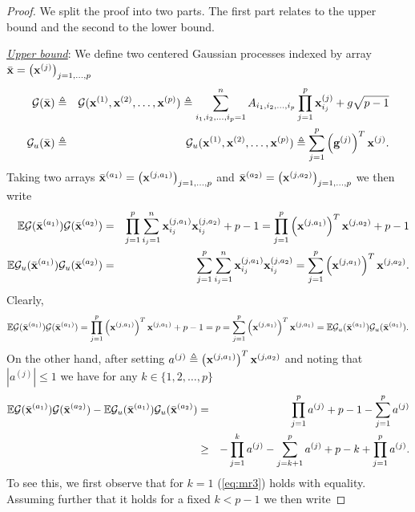 \documentclass[10pt]{article}
\def\x{{\bf x}}
\def\x{{\mathbf x}}
\def\x{{\bf x}}
\def\x{{\bf x}}
\def\g{{\bf g}}
\def\mE{{\mathbb E}}
\def\lp{\left (}
\def\rp{\right )}
\def\x{{\bf x}}
\def\x{{\mathbf x}}
\def\x{{\bf x}}
\def\x{{\bf x}}
\def\g{{\bf g}}
\def\cG{{\mathcal G}}
\begin{document}
\begin{proof}
  We split the proof into two parts. The first part relates to the upper bound and the second to the lower bound.

\noindent  \underline{\emph{Upper bound}}: We define two centered Gaussian processes indexed by array $\bar{\x}=\lp \x^{(j)}\rp_{j=1,\dots,p}$
  \begin{eqnarray}
\label{eq:mr1}
\cG (\bar{\x}) & \triangleq & \cG (\x^{(1)},\x^{(2)},\dots,\x^{(p)})  \triangleq \sum_{i_1,i_2,\dots,i_p=1}^n A_{i_1,i_2,\dots,i_p}\prod_{j=1}^{p}\x_{i_j}^{(j)}   + g\sqrt{p-1}  \nonumber   \\
\cG_u (\bar{\x}) & \triangleq & \cG_u (\x^{(1)},\x^{(2)},\dots,\x^{(p)})  \triangleq \sum_{j=1}^p \lp\g^{(j)}\rp^T\x^{(j)} .
  \end{eqnarray}
Taking two arrays $\bar{\x}^{(a_1)}=\lp \x^{(j,a_1)}\rp_{j=1,\dots,p}$ and $\bar{\x}^{(a_2)}=\lp \x^{(j,a_2)}\rp_{j=1,\dots,p}$ we then write
  \begin{eqnarray}
\label{eq:mr2}
\mE \cG (\bar{\x}^{(a_1)})\cG (\bar{\x}^{(a_2)} )   & =  & \prod_{j=1}^{p}  \sum_{i_j=1}^n   \x_{i_j}^{(j,a_1)}  \x_{i_j}^{(j,a_2)}  + p-1
=  \prod_{j=1}^{p}  \lp \x^{(j,a_1)} \rp^T\x^{(j,a_2)}  + p-1 \nonumber   \\
\mE \cG_u (\bar{\x}^{(a_1)})\cG_u (\bar{\x}^{(a_2)} )   & =  & \sum_{j=1}^p \sum_{i_j=1}^n \x_{i_j}^{(j,a_1)}\x_{i_j}^{(j,a_2)}
=
\sum_{j=1}^p
 \lp \x^{(j,a_1)} \rp^T\x^{(j,a_2)}.
  \end{eqnarray}
  Clearly,
 \begin{eqnarray}
\label{eq:mr2a}
\mE \cG (\bar{\x}^{(a_1)})\cG (\bar{\x}^{(a_1)} )
=  \prod_{j=1}^{p}  \lp \x^{(j,a_1)} \rp^T\x^{(j,a_1)}  + p-1
= p =\sum_{j=1}^p
 \lp \x^{(j,a_1)} \rp^T\x^{(j,a_1)} =
\mE \cG_u (\bar{\x}^{(a_1)})\cG_u (\bar{\x}^{(a_1)} )  .
  \end{eqnarray}
On the other hand,   after setting $a^{(j)}\triangleq\lp \x^{(j,a_1)} \rp^T\x^{(j,a_2)} $ and noting that $|a^{(j)}|\leq 1$ we have for any $k\in\{1,2,\dots, p\}$
 \begin{eqnarray}
\label{eq:mr3}
  \mE \cG (\bar{\x}^{(a_1)})\cG (\bar{\x}^{(a_2)} )
 -
\mE \cG_u (\bar{\x}^{(a_1)})\cG_u (\bar{\x}^{(a_2)} )
 & =  &
  \prod_{j=1}^{p} a^{(j)}  + p-1
-\sum_{j=1}^p
 a^{(j)}
   \nonumber \\
& \geq &  - \prod_{j=1}^{k} a^{(j)} -\sum_{j=k+1}^p
 a^{(j)}
 + p-k  +  \prod_{j=1}^{p} a^{(j)}.
  \end{eqnarray}
To see this, we first observe that for $k=1$ (\ref{eq:mr3}) holds with equality. Assuming further that it holds for a fixed $k<p-1$ we then write

\end{proof}
\end{document}
